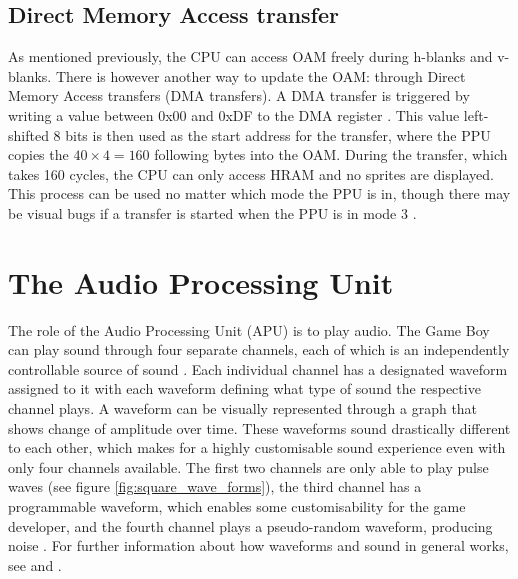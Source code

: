 \subsection{Direct Memory Access transfer}
\label{sec:DMA_transfer}
As mentioned previously, the CPU can access OAM freely during h-blanks and v-blanks. There is however another way to update the OAM: through Direct Memory Access transfers (DMA transfers). A DMA transfer is triggered by writing a value between 0x00 and 0xDF to the DMA register \cite{pandocsdma}. This value left-shifted 8 bits is then used as the start address for the transfer, where the PPU copies the $40 \times 4 = 160$ following bytes into the OAM. During the transfer, which takes 160 cycles, the CPU can only access HRAM and no sprites are displayed. This process can be used no matter which mode the PPU is in, though there may be visual bugs if a transfer is started when the PPU is in mode 3 \cite{pandocsdma}.


\section{The Audio Processing Unit }
\label{sec:APU}
The role of the Audio Processing Unit (APU) is to play audio. The Game Boy can play sound through four separate channels, each of which is an independently controllable source of sound \cite{pandocssound}. Each individual channel has a designated waveform assigned to it with each waveform defining what type of sound the respective channel plays. A waveform can be visually represented through a graph that shows change of amplitude over time. These waveforms sound drastically different to each other, which makes for a highly customisable sound experience even with only four channels available. The first two channels are only able to play pulse waves (see figure \ref{fig:square_wave_forms}), the third channel has a programmable waveform, which enables some customisability for the game developer, and the fourth channel plays a pseudo-random waveform, producing noise \cite{AudioHardware}. For further information about how waveforms and sound in general works, see \cite{waveforms} and \cite{sinToSquare}.

